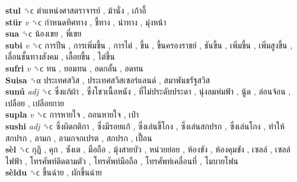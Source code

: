 \textbf{stul} ␝ϲ   ตำแหน่งศาสตราจารย์ ,  ม้านั่ง ,  เก้าอี้   \\
\textbf{stür} \emph{v}  ␝ϲ   กำหนดทิศทาง ,  ชี้ทาง ,  นำทาง ,  มุ่งหน้า   \\
\textbf{sua} ␝ϲ   น้องเขย ,  พี่เขย   \\
\textbf{subi} \emph{v}  ␝ϲ   การปีน ,  การเพิ่มขึ้น ,  การไต่ ,  ขึ้น ,  ขึ้นครองราชย์ ,  ชันขึ้น ,  เพิ่มขี้น ,  เพิ่มสูงขึ้น ,  เลื่อนชั้นทางสังคม ,  เลื้อยขึ้น ,  ไต่ขึ้น   \\
\textbf{sufri} \emph{v}  ␝ϲ   ทน ,  ยอมทน ,  อดกลั้น ,  อดทน   \\
\textbf{Suisa} ␝α   ประเทศสวิส ,  ประเทศสวิสเซอร์แลนด์ ,  สมาพันธรัฐสวิส   \\
\textbf{sunú} \emph{adj}  ␝ϲ   ซึ่งแก้ผ้า ,  ซึ่งโชวเนื้อหนัง ,  ที่ไม่ประดับประดา ,  นุ่งลมห่มฟ้า ,  นู้ด ,  ล่อนจ้อน ,  เปลือย ,  เปลือยกาย   \\
\textbf{supla} \emph{v}  ␝ϲ   การหายใจ ,  ถอนหายใจ ,  เป่า   \\
\textbf{sushi} \emph{adj}  ␝ϲ   ซึ่งผิดกติกา ,  ซึ่งมีรอยแก้ ,  ซึ่งเล่นขี้โกง ,  ซึ่งเล่นสกปรก ,  ซึ่งเล่นโกง ,  ทำให้สกปรก ,  ลามก ,  ลามกจกเปรต ,  สกปรก ,  เปื้อน   \\
\textbf{sèl} ␝ϲ   กุฏิ ,  คุก ,  ซังเต ,  มือถือ ,  มุ้งสายบัว ,  หน่วยย่อย ,  ห้องขัง ,  ห้องคุมขัง ,  เซลล์ ,  เซลล์ไฟฟ้า ,  โทรศัพท์ติดตามตัว ,  โทรศัพท์มือถือ ,  โทรศัพท์เคลื่อนที่ ,  โมบายโฟน   \\
\textbf{sèldu} ␝ϲ   ขึ้นฉ่าย ,  ผักขึ้นฉ่าย   \\
